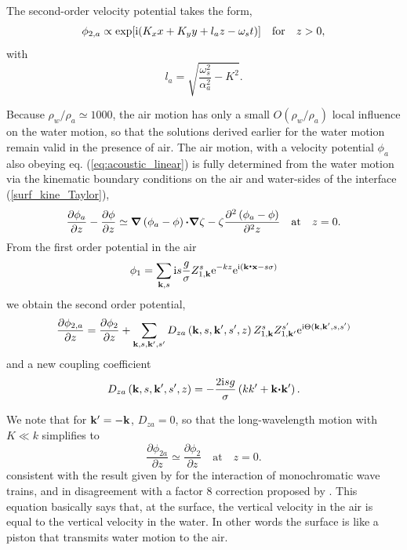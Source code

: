 The second-order velocity potential takes the form, 
\begin{equation}
 \phi_{2,a} \propto \exp[\mathrm{i}(K_{x} x +K_{y} y + l_a z - \omega_s t)] \quad \mathrm{for} \quad z> 0,
\end{equation} 
with
\begin{equation}
 l_a= \sqrt{\frac{\omega_s^2}{\alpha_a^2} - K^2}.
\end{equation}

Because $\rho_w/\rho_a \simeq 1000$, the air motion has only a small $O(\rho_w/\rho_a)$ local 
influence on the water motion, so that the 
solutions derived earlier for the water motion remain valid in the presence of air. 
The air motion, with a velocity potential $\phi_a$ also obeying eq. (\ref{eq:acoustic_linear}) 
is fully determined from the 
water motion via the kinematic boundary conditions on the air and water-sides 
of the interface (\ref{surf_kine_Taylor}), 
\begin{equation}
     \frac{\partial \phi_a }{\partial z} - \frac{\partial \phi }{\partial z} \simeq 
\mbox{\boldmath $\nabla$} \left(\phi_a -\phi\right)\mbox{\boldmath $\cdot$}\mbox{\boldmath $\nabla$} \zeta  - \zeta \frac{\partial^2 \left(\phi_a -\phi\right) }{\partial^2 z} \quad{\mathrm{at}} \quad z=0. \label{surf_kine_Taylora}
\end{equation}
From the first order potential in the air \citep[e.g.][]{Waxler&Gilbert2006}
\begin{equation}
     \phi_{1} = \sum_{\mathbf{k},s} \mathrm{i} s \frac{g}{\sigma}   Z_{1,\mathbf{k}}^{s}  \mathrm{e}^{-kz} \mathrm{e}^{\mathrm{i}\left(\mathbf{k} \mbox{\boldmath $\cdot$}{\mathbf x} - s \sigma\right)} 
\end{equation}
we obtain the second order potential, 
\begin{equation}
      \frac{\partial \phi_{2,a} }{\partial z} =\frac{\partial \phi_2}{\partial z} 
                    + \sum_{\mathbf{k},s,\mathbf{k^{\prime}},s'}  D_{za} \left(\mathbf{k},s,\mathbf{k^{\prime}},s',z \right) Z_{1,\mathbf{k}}^{s} Z_{1,\mathbf{k^{\prime}}}^{s'} 
\mathrm{e}^{\mathrm{i}
    \Theta(\mathbf{k},\mathbf{k^{\prime}},s,s')}\nonumber \\ \label{P2a}
\end{equation}
and a new coupling coefficient
\begin{eqnarray}
D_{za} \left(\mathbf{k},s,\mathbf{k^{\prime}},s',z\right)   = -\frac{2 \mathrm{i} s g}{\sigma} \left(k k' + \mathbf{k} \mbox{\boldmath $\cdot$} \mathbf{k^{\prime}}\right). \nonumber \\ \label{Dza}
\end{eqnarray}

We note that for $\mathbf{k^{\prime}} = -\mathbf{k}$, $D_{za}=0$, so that the long-wavelength motion with $K \ll k$ simplifies to 
\begin{equation}
     \frac{\partial \phi_{2a} }{\partial z} \simeq  \frac{\partial \phi_2 }{\partial z}   \quad{\mathrm{at}} \quad z=0. \label{surf_kine_Tayloratm}
\end{equation}
consistent with the result given by \cite{Posmentier1967} for the interaction of monochromatic wave trains, 
and in disagreement with a factor 8 correction proposed by \cite{Arendt&Fritts2000}. This equation basically says that, at the surface, the vertical velocity in the air is equal to the vertical velocity in the water. In other words the surface is like a piston that transmits water motion to the air. 

